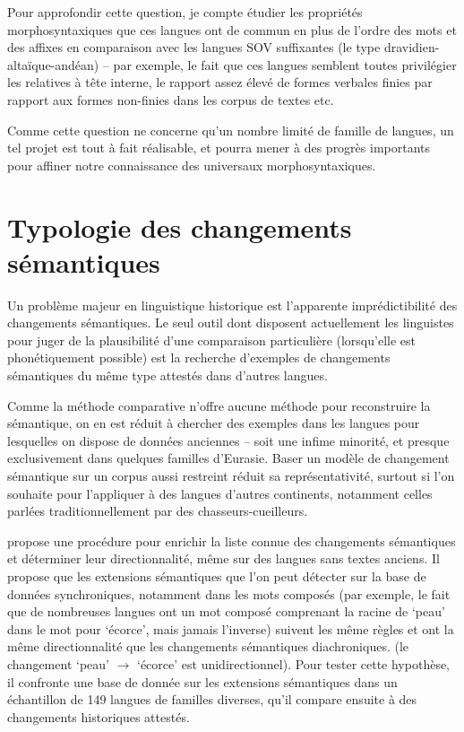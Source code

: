 \documentclass[oldfontcommands,oneside,a4paper,11pt]{article}
\begin{document}
Pour approfondir cette question, je compte étudier les propriétés morphosyntaxiques que ces langues ont de commun en plus de l'ordre des mots et des affixes en comparaison avec les langues SOV suffixantes (le type dravidien-altaïque-andéan) -- par exemple, le fait que ces langues semblent toutes privilégier les relatives à tête interne, le rapport assez élevé de formes verbales finies par rapport aux formes non-finies dans les corpus de textes etc. 

Comme cette question ne concerne qu'un nombre limité de famille de langues, un tel projet est tout à fait réalisable, et pourra mener à des progrès importants pour affiner notre connaissance des universaux morphosyntaxiques.

\section{Typologie des changements sémantiques}
Un problème majeur en linguistique historique est l'apparente imprédictibilité des changements sémantiques. Le seul outil dont disposent actuellement les linguistes pour juger de la plausibilité d'une comparaison particulière (lorsqu'elle est phonétiquement possible) est la recherche d'exemples de changements sémantiques du même type attestés dans d'autres langues.

Comme la méthode comparative n'offre aucune méthode pour reconstruire la sémantique, on en est réduit à chercher des exemples dans les langues pour lesquelles on dispose de données anciennes -- soit une infime minorité, et presque exclusivement dans quelques familles d'Eurasie. Baser un modèle de changement sémantique sur un corpus aussi restreint réduit sa représentativité, surtout si l'on souhaite pour l'appliquer à des langues d'autres continents, notamment celles parlées traditionnellement par des chasseurs-cueilleurs.
 
\citet{urban11semantic} propose une procédure pour enrichir la liste connue des changements sémantiques et déterminer leur directionnalité, même sur des langues sans textes anciens. Il propose que les extensions sémantiques que l'on peut détecter sur la base de données synchroniques, notamment dans les mots composés (par exemple, le fait que de nombreuses langues ont un mot composé comprenant la racine de `peau' dans le mot pour `écorce', mais jamais l'inverse) suivent les même règles et ont la même directionnalité que les changements sémantiques diachroniques. (le changement `peau' $\rightarrow$ `écorce' est unidirectionnel). Pour tester cette hypothèse, il confronte une base de donnée sur les extensions sémantiques dans un échantillon de 149 langues de familles diverses, qu'il compare ensuite à des changements historiques attestés.
\end{document}
